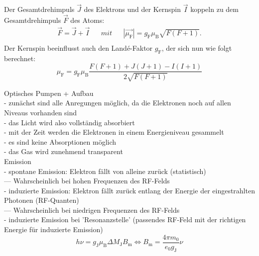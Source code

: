 Der Gesamtdrehimpuls $\vec{J}$ des Elektrons und der Kernspin $\vec{I}$ koppeln zu dem Gesamtdrehimpuls $\vec{F}$ des Atoms:
\begin{align*}
  \vec{F}=\vec{J}+\vec{I} && mit && |\vec{\mu_{\text{F}}}|= g_{\text{F}} \mu_{\text{B}} \sqrt{F(F+1)}.\\
\end{align*}
Der Kernspin beeinflusst auch den Landé-Faktor $g_{\text{F}}$, der sich nun wie folgt berechnet:
\begin{equation}
  \mu_{\text{F}}= g_{\text{F}} \mu_{\text{B}} \frac{F(F+1) + J(J+1) - I(I+1)}{2 \sqrt{F(F+1)}}
  \label{eqn:landef}
\end{equation}
%
%








Optisches Pumpen + Aufbau\\
- zunächst sind alle Anregungen möglich, da die Elektronen noch auf allen Niveaus vorhanden sind\\
- das Licht wird also vollständig absorbiert\\
- mit der Zeit werden die Elektronen in einem Energieniveau gesammelt\\
- es sind keine Absorptionen möglich\\
- das Gas wird zunehmend transparent\\

Emission\\
- spontane Emission: Elektron fällt von alleine zurück (statistisch)\\
  --- Wahrscheinlich bei hohen Frequenzen des RF-Felds\\
- induzierte Emission: Elektron fällt zurück entlang der Energie der eingestrahlten Photonen (RF-Quanten)\\
  --- Wahrscheinlich bei niedrigen Frequenzen des RF-Felds\\
- induzierte Emission bei 'Resonanzstelle' (passendes RF-Feld mit der richtigen Energie für induzierte Emission)\\
\begin{equation}
  h \nu = g_{\text{J}} \mu_{\text{B}} \Delta M_{\text{J}} B_{\text{m}} \Leftrightarrow B_{\text{m}} = \frac{4 \pi m_{0}}{e_{0} g_{\text{J}}} \nu
\label{eqn:resonanz}
\end{equation}


